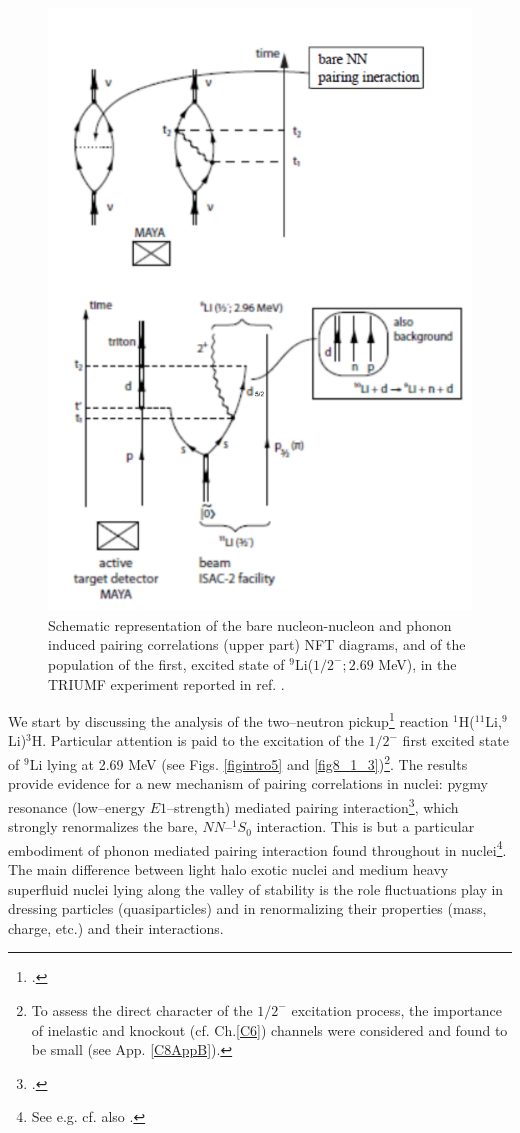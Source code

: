  \begin{figure}
 \centerline{\includegraphics*[width=15cm,angle=0]{C8/figsC8/fig8_1_1}}
 	\caption{Schematic representation of the bare nucleon-nucleon and phonon induced pairing correlations (upper part) NFT diagrams, and of the population of the first, excited state of $^{9}$Li($1/2^{-}; 2.69$ MeV), in the TRIUMF experiment  reported in ref. \cite{Tanihata:08}.}\label{fig8_1_1}
 \end{figure}
 We start by discussing  the analysis of the two--neutron pickup\footnote{\cite{Tanihata:08}.} reaction $^1$H($^{11}$Li,$^9$Li)$^3$H. Particular  attention is paid to the  excitation of the $1/2^-$ first excited state of $^9$Li lying at 2.69 MeV (see Figs. \ref{figintro5} and  \ref{fig8_1_3})\footnote{To assess the direct character of the $1/2^-$ excitation process, the importance of inelastic  and knockout (cf. Ch.\ref{C6}) channels were considered and found to be small (see App. \ref{C8AppB}).}. The results  provide evidence for a new mechanism of pairing correlations in nuclei: pygmy resonance (low--energy $E1$--strength) mediated pairing interaction\footnote{\citet{Barranco:01,Potel:10}.}, which strongly renormalizes the bare, $NN$--$^1S_0$ interaction. This is but a particular embodiment of phonon mediated pairing interaction found throughout in nuclei\footnote{See e.g. \citet{Barranco:99,Gori:04} cf. also \citet{Brink:05}.}. The main difference between light halo exotic nuclei and medium heavy superfluid nuclei lying along the valley of stability is the role fluctuations play in dressing particles (quasiparticles) and in renormalizing their properties (mass, charge, etc.) and their interactions.
